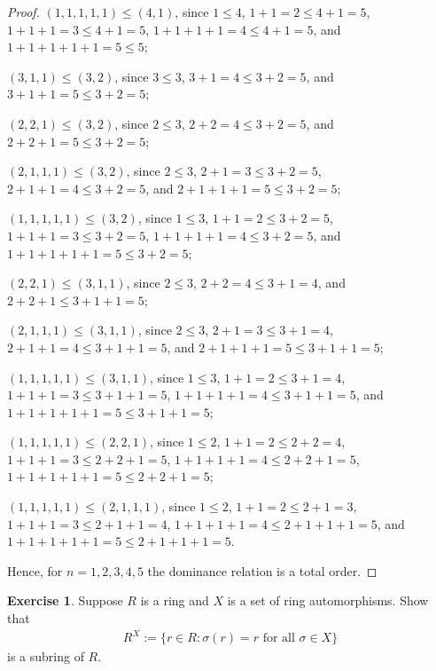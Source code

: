 \documentclass[12pt]{extarticle}
\newcommand{\set}[1]{\{#1\}}
\newcommand{\<}{\langle}
\renewcommand{\>}{\rangle}
\theoremstyle{definition}
\newtheorem{exercise}{Exercise}
\begin{document}
\begin{proof}
  $(1,1,1,1,1) \leq (4,1)$, since $1 \leq 4$, $1+1=2 \leq 4+1=5$, $1+1+1 = 3 \leq 4+1=5$, $1+1+1+1=4 \leq 4+1=5$, and $1+1+1+1+1 = 5 \leq 5$;

  $(3,1,1) \leq (3,2)$, since $ 3 \leq 3$, $3+1=4 \leq 3+2=5$, and $3+1+1 = 5 \leq 3+2 = 5$;

  $(2,2,1) \leq (3,2)$, since $2 \leq 3$, $2+2=4 \leq 3+2=5$, and $2+2+1=5 \leq 3+2=5$;

  $(2,1,1,1) \leq (3,2)$, since $ 2 \leq 3$, $2 + 1 = 3 \leq 3 + 2 = 5$, $2+1+1 = 4 \leq 3+2 = 5$, and $2+1+1+1 = 5 \leq 3+2=5$;

  $(1,1,1,1,1) \leq (3,2)$, since $1 \leq 3$, $1+1=2 \leq 3+2=5$, $1+1+1=3 \leq 3+2=5$, $1+1+1+1=4 \leq 3+2=5$, and $1+1+1+1+1=5 \leq 3+2=5$;

  $(2,2,1) \leq (3,1,1)$, since $ 2 \leq 3$, $2+2=4 \leq 3+1=4$, and $2+2+1 \leq 3+1+1=5$;

  $(2,1,1,1) \leq (3,1,1)$, since $2 \leq 3$, $2+1=3 \leq 3+1=4$, $2+1+1=4 \leq 3+1+1=5$, and $2+1+1+1=5 \leq 3+1+1=5$;

  $(1,1,1,1,1) \leq (3,1,1)$, since $1 \leq 3$, $1+1=2 \leq 3+1=4$, $1+1+1=3 \leq 3+1+1=5$, $1+1+1+1=4 \leq 3+1+1=5$, and $1+1+1+1+1=5 \leq 3+1+1=5$;

  $(1,1,1,1,1) \leq (2,2,1)$, since $1 \leq 2$, $1+1=2 \leq 2+2=4$, $1+1+1 = 3 \leq 2+2+1 = 5$, $1+1+1+1=4 \leq 2+2+1=5$, $1+1+1+1+1 = 5 \leq 2+2+1=5$;

  $(1,1,1,1,1) \leq (2,1,1,1)$, since $1 \leq 2$, $1+1=2 \leq 2+1=3$, $1+1+1=3 \leq 2+1+1=4$, $1+1+1+1=4 \leq 2+1+1+1=5$, and $1+1+1+1+1 = 5 \leq 2+1+1+1=5$.

  Hence, for $n=1,2,3,4,5$ the dominance relation is a total order. 

\end{proof}
\begin{exercise}
  Suppose $R$ is a ring and $X$ is a set of ring automorphisms. Show that
  \begin{align*}
    R^X := \set{r \in R: \sigma(r)=r \text{ for all } \sigma \in X}
  \end{align*}
  is a subring of $R$. 
\end{exercise}
\end{document}

